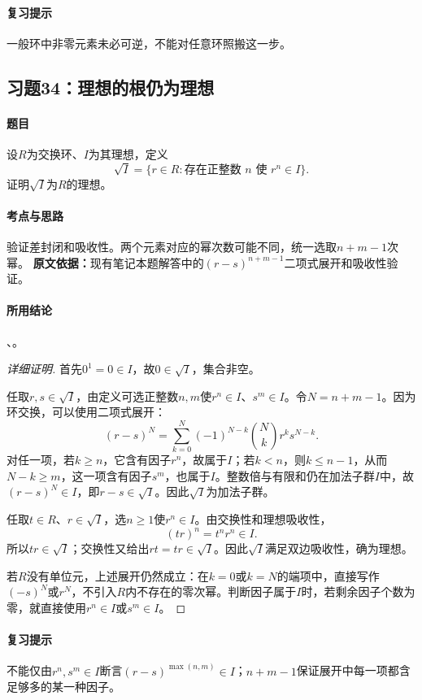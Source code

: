 \paragraph{复习提示}
一般环中非零元素未必可逆，不能对任意环照搬这一步。

\subsection{习题34：理想的根仍为理想}
\paragraph{题目}
设$R$为交换环、$I$为其理想，定义
\[
\sqrt I=\{r\in R:\text{存在正整数 }n\text{ 使 }r^n\in I\}.
\]
证明$\sqrt I$为$R$的理想。
\paragraph{考点与思路}
验证差封闭和吸收性。两个元素对应的幂次数可能不同，统一选取$n+m-1$次幂。
\textbf{原文依据：}现有笔记本题解答中的$(r-s)^{n+m-1}$二项式展开和吸收性验证。
\paragraph{所用结论}
、。
\begin{proof}[详细证明]
首先$0^1=0\in I$，故$0\in\sqrt I$，集合非空。

任取$r,s\in\sqrt I$，由定义可选正整数$n,m$使$r^n\in I$、$s^m\in I$。令$N=n+m-1$。因为环交换，可以使用二项式展开：
\[
(r-s)^N=\sum_{k=0}^{N}(-1)^{N-k}\binom Nk r^k s^{N-k}.
\]
对任一项，若$k\geq n$，它含有因子$r^n$，故属于$I$；若$k<n$，则$k\leq n-1$，从而$N-k\geq m$，这一项含有因子$s^m$，也属于$I$。整数倍与有限和仍在加法子群$I$中，故$(r-s)^N\in I$，即$r-s\in\sqrt I$。因此$\sqrt I$为加法子群。

任取$t\in R$、$r\in\sqrt I$，选$n\geq1$使$r^n\in I$。由交换性和理想吸收性，
\[
(tr)^n=t^nr^n\in I.
\]
所以$tr\in\sqrt I$；交换性又给出$rt=tr\in\sqrt I$。因此$\sqrt I$满足双边吸收性，确为理想。

若$R$没有单位元，上述展开仍然成立：在$k=0$或$k=N$的端项中，直接写作$(-s)^N$或$r^N$，不引入$R$内不存在的零次幂。判断因子属于$I$时，若剩余因子个数为零，就直接使用$r^n\in I$或$s^m\in I$。
\end{proof}
\paragraph{复习提示}
不能仅由$r^n,s^m\in I$断言$(r-s)^{\max(n,m)}\in I$；$n+m-1$保证展开中每一项都含足够多的某一种因子。


